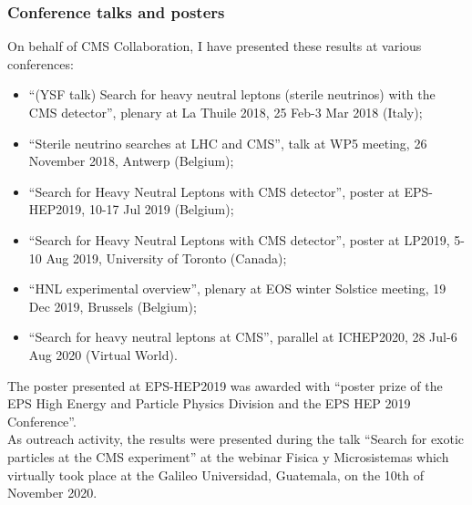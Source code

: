 \subsubsection*{Conference talks and posters}
On behalf of CMS Collaboration, I have presented these results at
various conferences:
\begin{itemize}
\item ``(YSF talk) Search for heavy neutral leptons (sterile
  neutrinos) with the CMS detector'', plenary at La Thuile 2018, 25
  Feb-3 Mar 2018 (Italy);
\item ``Sterile neutrino searches at LHC and CMS'', talk at WP5
  meeting, 26 November 2018, Antwerp (Belgium);
\item ``Search for Heavy Neutral Leptons with CMS detector'', poster at
  EPS-HEP2019, 10-17 Jul 2019 (Belgium);
\item ``Search for Heavy Neutral Leptons with CMS detector'', poster at
  LP2019, 5-10 Aug 2019, University of Toronto (Canada);
\item ``HNL experimental overview'', plenary at EOS winter Solstice
  meeting, 19 Dec 2019, Brussels (Belgium);
\item 	``Search for heavy neutral leptons at CMS'', parallel at
  ICHEP2020, 28 Jul-6 Aug 2020 (Virtual World).
\end{itemize}
The poster presented at EPS-HEP2019 was awarded with ``poster prize of
the EPS High Energy and Particle Physics Division and the EPS HEP 2019
Conference''.\\
As outreach activity, the results were presented during the talk
``Search for exotic particles at the CMS experiment'' at the webinar
Fisica y Microsistemas which virtually took place at the Galileo Universidad,
Guatemala, on the 10th of November 2020.